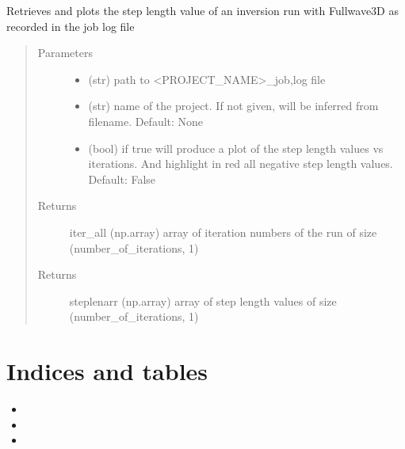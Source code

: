 \documentclass[letterpaper,10pt,english]{sphinxmanual}
\begin{document}
\begin{fulllineitems}
\label{\detokenize{index:fullwaveqc.inversion.steplen}}
Retrieves and plots the step length value of an inversion run with Fullwave3D as recorded in the job log
file
\begin{quote}\begin{description}
\item[{Parameters}] \leavevmode\begin{itemize}
\item {} 
 \textendash{} (str)      path to \textless{}PROJECT\_NAME\textgreater{}\_job,log file

\item {} 
 \textendash{} (str)      name of the project. If not given, will be inferred from filename. Default: None

\item {} 
 \textendash{} (bool)     if true will produce a plot of the step length values vs iterations. And highlight
in red all negative step length values. Default: False

\end{itemize}

\item[{Returns}] \leavevmode
iter\_all     (np.array) array of iteration numbers of the run of size (number\_of\_iterations, 1)

\item[{Returns}] \leavevmode
steplenarr   (np.array) array of step length values of size (number\_of\_iterations, 1)

\end{description}\end{quote}

\end{fulllineitems}



\chapter{Indices and tables}
\label{\detokenize{index:indices-and-tables}}\begin{itemize}
\item {} 

\item {} 

\item {} 

\end{itemize}
\end{document}
